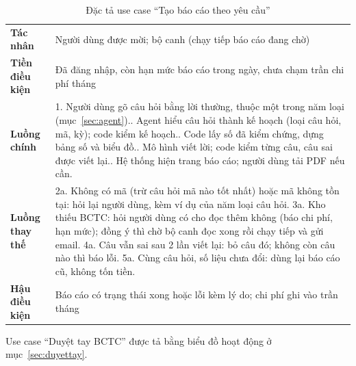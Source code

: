 \documentclass[12pt,a4paper]{report}
\newcommand{\enquote}[1]{“#1”}
\begin{document}
\begin{table}[H]
\centering\small
\caption{Đặc tả use case \enquote{Tạo báo cáo theo yêu cầu}}\label{tab:uc-baocao}
\begin{tabularx}{\linewidth}{@{}>{\bfseries}p{3.2cm}X@{}}
\toprule
Tác nhân & Người dùng được mời; bộ canh (chạy tiếp báo cáo đang chờ) \\
Tiền điều kiện & Đã đăng nhập, còn hạn mức báo cáo trong ngày, chưa chạm trần chi phí tháng \\
Luồng chính & 1. Người dùng gõ câu hỏi bằng lời thường, thuộc một trong năm loại (mục~\ref{sec:agent}).\newline
2. Agent hiểu câu hỏi thành kế hoạch (loại câu hỏi, mã, kỳ); code kiểm kế hoạch.\newline
3. Code lấy số đã kiểm chứng, dựng bảng số và biểu đồ.\newline
4. Mô hình viết lời; code kiểm từng câu, câu sai được viết lại.\newline
5. Hệ thống hiện trang báo cáo; người dùng tải PDF nếu cần. \\
Luồng thay thế & 2a. Không có mã (trừ câu hỏi mã nào tốt nhất) hoặc mã không tồn tại: hỏi lại người dùng, kèm ví dụ
của năm loại câu hỏi.\newline
3a. Kho thiếu BCTC: hỏi người dùng có cho đọc thêm không (báo chi phí, hạn mức); đồng ý thì chờ bộ canh đọc xong rồi
chạy tiếp và gửi email.\newline
4a. Câu vẫn sai sau 2 lần viết lại: bỏ câu đó; không còn câu nào thì báo lỗi.\newline
5a. Cùng câu hỏi, số liệu chưa đổi: dùng lại báo cáo cũ, không tốn tiền. \\
Hậu điều kiện & Báo cáo có trạng thái xong hoặc lỗi kèm lý do; chi phí ghi vào trần tháng \\
\bottomrule
\end{tabularx}
\end{table}

Use case \enquote{Duyệt tay BCTC} được tả bằng biểu đồ hoạt động ở mục~\ref{sec:duyettay}.
\end{document}
